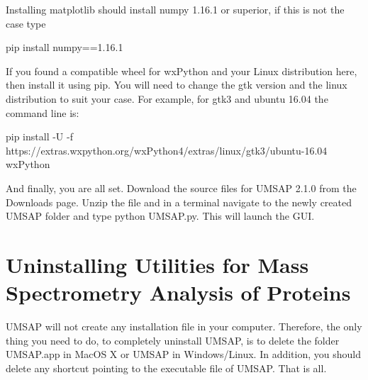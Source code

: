 Installing matplotlib should install numpy 1.16.1 or superior, if this is not the case type

pip install numpy==1.16.1

If you found a compatible wheel for wxPython and your Linux distribution here, then install it using pip. You will need to change the gtk version and the linux distribution to suit your case. For example, for gtk3 and ubuntu 16.04 the command line is:

pip install -U -f https://extras.wxpython.org/wxPython4/extras/linux/gtk3/ubuntu-16.04 wxPython

And finally, you are all set. Download the source files for UMSAP \num[parse-numbers=false]{2.1.0} from the Downloads page. Unzip the file and in a terminal navigate to the newly created UMSAP folder and type python UMSAP.py. This will launch the GUI.

\section{Uninstalling Utilities for Mass Spectrometry Analysis of Proteins}

UMSAP will not create any installation file in your computer. Therefore, the only thing you need to do, to completely uninstall UMSAP, is to delete the folder UMSAP.app in MacOS X or UMSAP in Windows/Linux. In addition, you should delete any shortcut pointing to the executable file of UMSAP. That is all.  